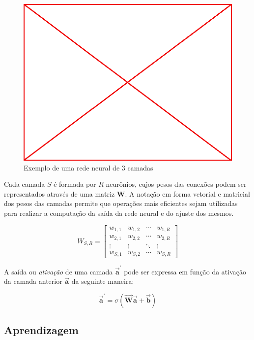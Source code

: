 \begin{figure}\label{fig:003-nn}
  \caption{Exemplo de uma rede neural de 3 camadas}
  \begin{center}
    \includegraphics[scale=0.5]{placeholder}
  \end{center}
\end{figure}

Cada camada $S$ é formada por $R$ neurônios, cujos pesos das conexões podem ser
representados através de uma matriz $\mathbf{W}$. A notação em forma vetorial e
matricial dos pesos das camadas permite que operações mais eficientes sejam
utilizadas para realizar a computação da saída da rede neural e do ajuste dos
mesmos.

$$ W_{S,R} =
\begin{bmatrix}
  w_{1,1} & w_{1,2} & \cdots & w_{1,R} \\
  w_{2,1} & w_{2,2} & \cdots & w_{2,R} \\
  \vdots  & \vdots  & \ddots & \vdots  \\
  w_{S,1} & w_{S,2} & \cdots & w_{S,R}
\end{bmatrix}
$$

A saída ou \emph{ativação} de uma camada $\mathbf{\vec a^{\prime}}$ pode ser expressa em função da
ativação da camada anterior $\mathbf{\vec a}$ da seguinte maneira:

$$\mathbf{\vec a^{\prime}} = \sigma(\mathbf{\vec W\vec a+\vec b})$$

\subsection{Aprendizagem}

